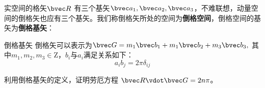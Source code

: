 实空间的格矢$\bvec R$ 有三个基矢$\bvec a_1, \bvec a_2, \bvec a_3$，不难联想，动量空间的倒格矢也应有三个基矢。我们称倒格矢所处的空间为\textbf{倒格空间}，倒格空间的基矢为\textbf{倒格基矢}：
\begin{definition}{倒格基矢}
倒格矢可以表示为$\bvec G = m_1 \bvec b_1 +  m_1 \bvec b_2 + m_3 \bvec b_3,~$其中$ m_1,m_2,m_3 \in \mathrm{Z}$，$b_i$与$a_i$满足关系如下：
\begin{equation}
a_i b_j = 2\pi \delta_{ij}
\end{equation}
\end{definition}

\begin{exercise}{}
利用倒格基矢的定义，证明劳厄方程 $\bvec R \vdot \bvec G = 2 n \pi$。
\end{exercise}
